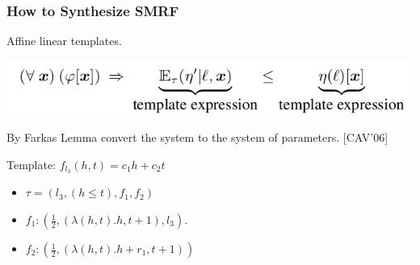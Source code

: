 \documentclass[11pt]{beamer}
\begin{document}
\begin{frame}\frametitle{How to Synthesize SMRF}

Affine  linear templates.

\begin{center}
\includegraphics[scale=0.35]{template.png}
\end{center}

By Farkas Lemma convert the  system to the system of parameters. [CAV'06]

\begin{example}
Template: $f_{l_3}(h,t) = c_1h + c_2t$

\begin{itemize}
\item $\tau = (l_3, (h\le t), f_1, f_2)$
\item $f_1: (\frac{1}{2}, (\lambda(h,t). h, t+1), l_3)$.
\item $f_2: (\frac{1}{2}, (\lambda(h,t). h+r_1, t+1))$
\end{itemize}

\end{example}

\end{frame}
\end{document}
